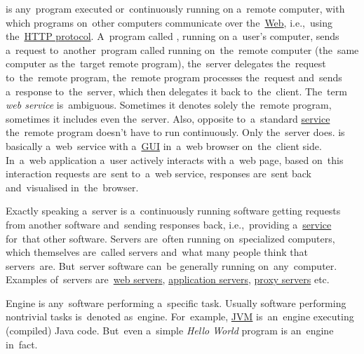 \label{webserviceapplication}
\begin{itemize}
     is any~program executed or~continuously running on a~remote computer, with which programs on~other computers communicate over the~\hyperref[internetweb]{Web}, i.e.,~using the~\hyperref[http]{HTTP protocol}.
            A~program called \hyperref[clientserverarchitecture]{}, running on a~user's computer, sends a~request to~another~program called \hyperref[clientserverarchitecture]{} running on~the~remote computer (the~same computer as the~target remote program), the~server delegates the~request to~the~remote program, the~remote program processes the~request and~sends a~response to~the~server, which then delegates it back to~the~client.
            \warningnonl The~term \textit{web service} is~ambiguous.
            Sometimes it denotes solely the~remote program, sometimes it includes even the~server.
            Also, opposite to~a~standard \hyperref[applicationprocessprogramservicethread]{service} the~remote program doesn't have to run continuously.
            Only the~server does.
     is basically a~web~service with a~\hyperref[shellcligui]{GUI} in~a~web browser on~the~client side.
            In~a~web application a~user actively interacts with a~web page, based on~this interaction requests are~sent to~a~web service, responses are~sent back and~visualised in~the~browser.
\end{itemize}

\label{server}
Exactly speaking a~server is a~continuously running software getting requests from another software and~sending responses back, i.e.,~providing a~\hyperref[applicationprocessprogramservicethread]{service} for~that other software.
Servers are~often running on~specialized computers, which themselves are~called servers and~what many people think that servers~are.
But~server software can~be generally running on~any~computer.
Examples of~servers are~\hyperref[webserver]{web servers}, \hyperref[applicationserver]{application servers}, \hyperref[proxy]{proxy servers} etc.

\label{engine}
Engine is any~software performing a~specific task.
Usually software performing nontrivial tasks is~denoted as~engine.
For~example, \hyperref[jdkjrejvm]{JVM} is~an~engine executing (compiled) Java code.
But~even a~simple \textit{Hello World} program is an~engine in~fact.
\newpage

